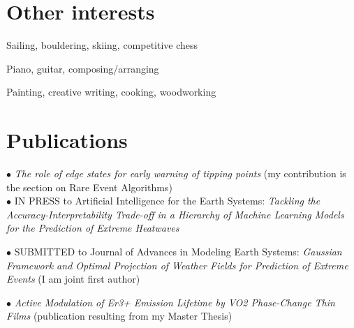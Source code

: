 \documentclass[11pt, a4 paper]{article}
\newcommand{\bu}{$\bullet$ }
\begin{document}
\section*{Other interests}
  \begin{description}[style=multiline,leftmargin=3cm,align=right]
    \item[Sports] Sailing, bouldering, skiing, competitive chess
    \item[Music] Piano, guitar, composing/arranging
    \item[Other] Painting, creative writing, cooking, woodworking
  \end{description}

\section*{Publications}
  \begin{description}[style=multiline,leftmargin=3cm,align=right]
    \item[2025]
    \bu \emph{The role of edge states for early warning of tipping points} \cite{lohmannRoleEdgeStates2025} (my contribution is the section on Rare Event Algorithms) \\
    \bu IN PRESS to Artificial Intelligence for the Earth Systems: \emph{Tackling the Accuracy-Interpretability Trade-off in a Hierarchy of Machine Learning Models for the Prediction of Extreme Heatwaves} \cite{lovoTacklingAccuracyInterpretabilityTradeHierarchy2024}
    \item[2024]
    \bu SUBMITTED to Journal of Advances in Modeling Earth Systems: \emph{Gaussian Framework and Optimal Projection of Weather Fields for Prediction of Extreme Events} \cite{mascoloGaussianFrameworkOptimal2024} (I am joint first author)
    \item[2023]
    \bu \emph{Active Modulation of Er3+ Emission Lifetime by VO2 Phase-Change Thin Films} \cite{kalinicActiveModulationEr32024} (publication resulting from my Master Thesis)
  \end{description}
\end{document}
